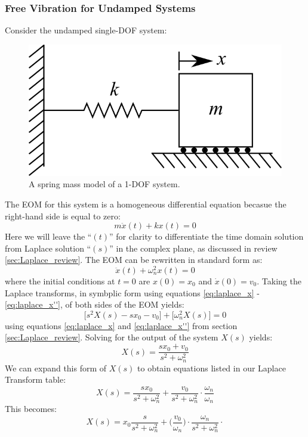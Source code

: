 \documentclass[12pt,letter]{article}
\numberwithin{ex}{section} %
\numberwithin{re}{section} %
\begin{document}
			\subsubsection{Free Vibration for Undamped Systems}
			Consider the undamped single-DOF system:
			\begin{figure}[H]
				\centering
				\includegraphics[]{../Figures/1-DOF-spring_mass_horizontal.png}
				\caption{A spring mass model of a 1-DOF system.}
			\end{figure}
			\noindent The EOM for this system is a homogeneous differential equation becasue the right-hand side is equal to zero:
			\begin{equation}
				m\ddot{x}(t) + kx(t) = 0 
			\end{equation}
			Here we will leave the ``$(t)$'' for clarity to differentiate the time domain solution from Laplace solution ``$(s)$'' in the complex plane, as discussed in review \ref{sec:Laplace_review}. The EOM can be rewritten in standard form as:
			\begin{equation}
				\ddot{x}(t) + \omega_n^2x(t) = 0 
			\end{equation}
			where the initial conditions at $t=0$ are $x(0)=x_0$ and $\dot{x}(0) = v_0$. Taking the Laplace transforms, in symbplic form using equations \ref{eq:laplace_x} - \ref{eq:laplace_x''}, of both sides of the EOM yields:
			\begin{equation}
				\big[s^2X(s) -sx_0 -v_0 \big] + \big[ \omega_n^2X(s) \big] =0
			\end{equation}
			using equations \ref{eq:laplace_x} and \ref{eq:laplace_x''} from section \ref{sec:Laplace_review}. Solving for the output of the system $X(s)$ yields:
			\begin{equation}
			X(s) = \frac{sx_0 + v_0}{s^2 + \omega_n^2}
			\end{equation}
			We can expand this form of $X(s)$ to obtain equations listed in our Laplace Transform table:
			\begin{equation}
			X(s) = \frac{sx_0}{s^2 + \omega_n^2} + \frac{v_0}{s^2 + \omega_n^2}\cdot \frac{\omega_n}{\omega_n}
			\end{equation}
			This becomes:
			\begin{equation}
			X(s) = x_0\frac{s}{s^2 + \omega_n^2} + \bigg(\frac{v_0}{\omega_n}\bigg) \cdot \frac{\omega_n}{s^2 + \omega_n^2}\cdot 
			\end{equation}
			
\end{document}
